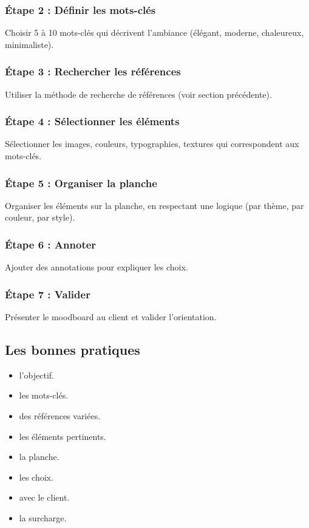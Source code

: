\subsubsection{Étape 2 : Définir les mots-clés}

Choisir 5 à 10 mots-clés qui décrivent l'ambiance (élégant, moderne, chaleureux, minimaliste).

\subsubsection{Étape 3 : Rechercher les références}

Utiliser la méthode de recherche de références (voir section précédente).

\subsubsection{Étape 4 : Sélectionner les éléments}

Sélectionner les images, couleurs, typographies, textures qui correspondent aux mots-clés.

\subsubsection{Étape 5 : Organiser la planche}

Organiser les éléments sur la planche, en respectant une logique (par thème, par couleur, par style).

\subsubsection{Étape 6 : Annoter}

Ajouter des annotations pour expliquer les choix.

\subsubsection{Étape 7 : Valider}

Présenter le moodboard au client et valider l'orientation.

\subsection{Les bonnes pratiques}

\begin{itemize}
    \item {} l'objectif.
    \item {} les mots-clés.
    \item {} des références variées.
    \item {} les éléments pertinents.
    \item {} la planche.
    \item {} les choix.
    \item {} avec le client.
    \item {} la surcharge.
\end{itemize}

